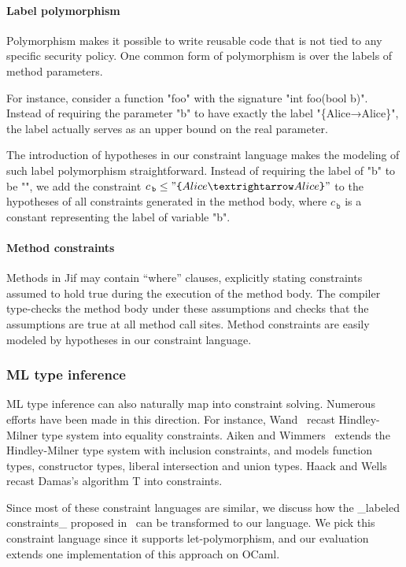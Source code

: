 \paragraph{Label polymorphism}

Polymorphism makes it possible to write reusable code that is not tied
to any specific security policy. One common form of polymorphism is
over the labels of method parameters. 

For instance, consider a function "foo"
with the signature "int foo(bool b)".
Instead of requiring the parameter "b" to have exactly the label
"\{Alice→Alice\}", the label actually serves as an upper bound on the
real parameter.

The introduction of hypotheses in our constraint language makes the
modeling of such label polymorphism straightforward. Instead of
requiring the label of "b" to
be "", we add the constraint $c_{\,\texttt{b}} \leq
"\lab{Alice→Alice}"$ to the hypotheses of all constraints generated in the
method body, where $c_{\,\texttt{b}}$ is a constant representing the label of
variable "b".

\paragraph{Method constraints}

Methods in Jif may contain ``where'' clauses, explicitly stating
constraints assumed to hold true during the execution of the method
body. The compiler type-checks the method body under these assumptions
and checks that the assumptions are true at all method call sites. 
Method constraints are easily modeled by hypotheses in our
constraint language.
 
\subsubsection{ML type inference}

ML type inference can also naturally map into constraint solving. Numerous 
efforts have been made in this direction. For instance,
Wand~\cite{wand-typeinference} recast Hindley-Milner type system into equality
constraints. Aiken and Wimmers~\cite{aiken-typeinclusion} extends the
Hindley-Milner type system with inclusion constraints, and models function
types, constructor types, liberal intersection and union types. Haack and Wells
~\cite{haack:slicing} recast Damas’s algorithm T into constraints.

Since most of these constraint languages are similar, we discuss how
the _labeled constraints_ proposed in~\cite{haack:slicing} can be
transformed to our language. We pick this constraint language since it
supports let-polymorphism, and our evaluation extends one
implementation of this approach on OCaml.

